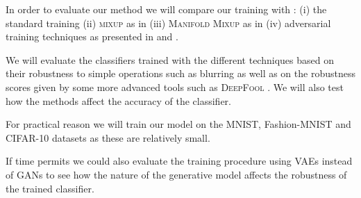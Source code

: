 \documentclass{article}
\begin{document}
In order to evaluate our method we will compare our training with : (i) the standard training (ii) \textsc{mixup} as in \cite{mixup1} (iii) \textsc{Manifold Mixup} as in \cite{mixup2} (iv) adversarial training techniques as presented in \cite{adv} and \cite{gat}.

We will evaluate the classifiers trained with the different techniques based on their robustness to simple operations such as blurring as well as on the robustness scores given by some more advanced tools such as \textsc{DeepFool} \cite{deepFool}. We will also test how the methods affect the accuracy of the classifier.

For practical reason we will train our model on the MNIST, Fashion-MNIST and CIFAR-10 datasets as these are relatively small. 

If time permits we could also evaluate the training procedure using VAEs \cite{VAE} instead of GANs to see how the nature of the generative model affects the robustness of the trained classifier. 

\printbibliography
\end{document}
